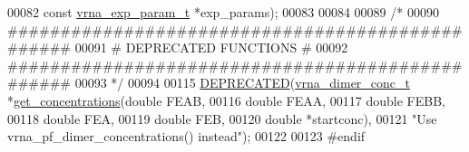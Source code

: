 \begin{DoxyCode}
00082                                                 \textcolor{keyword}{const} \mbox{\hyperlink{group__energy__parameters_structvrna__exp__param__s}{vrna\_exp\_param\_t}}  *exp\_params);
00083 
00084 
00089 \textcolor{comment}{/*}
00090 \textcolor{comment}{ #################################################}
00091 \textcolor{comment}{ # DEPRECATED FUNCTIONS                          #}
00092 \textcolor{comment}{ #################################################}
00093 \textcolor{comment}{ */}
00094 
00115 \mbox{\hyperlink{concentrations_8h_aab347a3c03fbe8e7319551b9fa0cce4a}{DEPRECATED}}(\mbox{\hyperlink{structvrna__dimer__conc__s}{vrna\_dimer\_conc\_t}} *\mbox{\hyperlink{concentrations_8h_a163159722a422ba90335a601fc34b8fb}{get\_concentrations}}(\textcolor{keywordtype}{double} FEAB,
00116                                                  \textcolor{keywordtype}{double} FEAA,
00117                                                  \textcolor{keywordtype}{double} FEBB,
00118                                                  \textcolor{keywordtype}{double} FEA,
00119                                                  \textcolor{keywordtype}{double} FEB,
00120                                                  \textcolor{keywordtype}{double} *startconc),
00121           \textcolor{stringliteral}{"Use vrna\_pf\_dimer\_concentrations() instead"});
00122 
00123 \textcolor{preprocessor}{#endif}
\end{DoxyCode}
